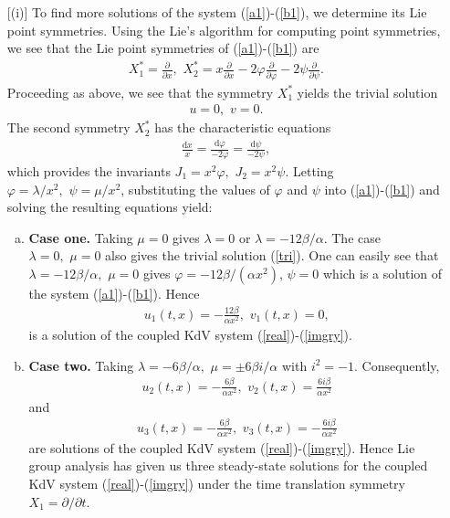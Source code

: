 \begin{enumerate} [(i)]
To find more solutions of the system (\ref{a1})-(\ref{b1}), we determine its Lie point symmetries.
Using the Lie's algorithm for computing point symmetries, we see that  the Lie point symmetries of (\ref{a1})-(\ref{b1}) are \begin{align} X_1^{*} = \frac{\partial }{ \partial x},\,\, X_2^{*}=x \frac{ \partial }{ \partial x}- 2 \varphi \frac{ \partial }{ \partial \varphi}-2 \psi
\frac{\partial }{ \partial \psi}.
\end{align}
Proceeding as above, we see that the symmetry $X_1^{*}$ yields the trivial solution \begin{align}
u=0,\,\, v=0. \label{tri}
\end{align}
The second symmetry $ X_2^{*}$  has the characteristic equations \begin{align}
\frac{\mathrm{d}x}{x}= \frac{\mathrm{d} \varphi}{-2 \varphi}=\frac{\mathrm{d} \psi }{-2 \psi},
\end{align} 
which provides the invariants $ J_1 = x^2 \varphi, \,\,  J_2 = x^2 \psi$.
Letting $\varphi =  {\lambda}/{x^2}, \,\,  \psi =  {\mu}/{x^2}$,  substituting the values of $\varphi$ and $\psi$ into (\ref{a1})-(\ref{b1}) and solving the resulting equations yield: 
\begin{enumerate}[(a)]
	
\item \textbf{Case one.} Taking 
 $ \mu =0$ gives $\lambda =0$ or $ \lambda = -12\beta/ \alpha$.\newline
 The case $ \lambda = 0,\,\, \mu=0$ also gives the trivial solution (\ref{tri}).
One can easily see that  $ \lambda = -12\beta/\alpha,\,\, \mu=0$ gives $\varphi=- {12 \beta}/(\alpha x^2)$, 
$\psi=0$ which  is a solution of the system (\ref{a1})-(\ref{b1}).
Hence
\begin{align}
u_1(t,x)=-\frac{12 \beta}{ \alpha x^2}, \,\, v_1(t,x)=0,
\end{align} 
is a solution of the coupled KdV system (\ref{real})-(\ref{imgry}).

\item \textbf{Case two.} Taking
$\lambda=- {6\beta}/{\alpha}, \,\, \mu = \pm   {6 \beta i}/{\alpha}$ with $i^2=-1$.  Consequently, 
\begin{align}
u_2(t,x) = - \frac{6  \beta }{ \alpha x^2},\,\,
v_2(t,x) =  \frac{ 6 i \beta }{ \alpha x^2} 
\end{align} 
and 
\begin{align}
u_3(t,x) =- \frac{6  \beta }{ \alpha x^2}, \,\,
v_3(t,x) =  -\frac{6 i \beta }{ \alpha x^2} 
\end{align} 
are solutions of the coupled KdV system (\ref{real})-(\ref{imgry}). Hence Lie group analysis has given us three steady-state solutions for the coupled KdV system (\ref{real})-(\ref{imgry}) under the time translation symmetry $X_1 = {\partial }/{ \partial t}$.


\end{enumerate}
\end{enumerate}
